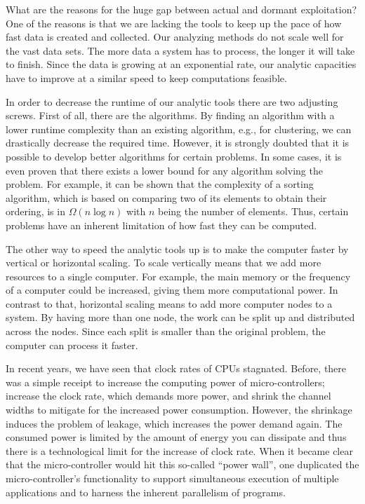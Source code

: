 What are the reasons for the huge gap between actual and dormant exploitation?
One of the reasons is that we are lacking the tools to keep up the pace of how fast data is created and collected.
Our analyzing methods do not scale well for the vast data sets.
The more data a system has to process, the longer it will take to finish.
Since the data is growing at an exponential rate, our analytic capacities have to improve at a similar speed to keep computations feasible.

In order to decrease the runtime of our analytic tools there are two adjusting screws.
First of all, there are the algorithms.
By finding an algorithm with a lower runtime complexity than an existing algorithm, e.g., for clustering, we can drastically decrease the required time.
However, it is strongly doubted that it is possible to develop better algorithms for certain problems.
In some cases, it is even proven that there exists a lower bound for any algorithm solving the problem.
For example, it can be shown that the complexity of a sorting algorithm, which is based on comparing two of its elements to obtain their ordering, is in $\Omega\left(n\log n\right)$ with $n$ being the number of elements.
Thus, certain problems have an inherent limitation of how fast they can be computed.

The other way to speed the analytic tools up is to make the computer faster by vertical or horizontal scaling.
To scale vertically means that we add more resources to a single computer.
For example, the main memory or the frequency of a computer could be increased, giving them more computational power.
In contrast to that, horizontal scaling means to add more computer nodes to a system.
By having more than one node, the work can be split up and distributed across the nodes.
Since each split is smaller than the original problem, the computer can process it faster.

In recent years, we have seen that clock rates of CPUs stagnated.
Before, there was a simple receipt to increase the computing power of micro-controllers; increase the clock rate, which demands more power, and shrink the channel widths to mitigate for the increased power consumption.
However, the shrinkage induces the problem of leakage, which increases the power demand again.
The consumed power is limited by the amount of energy you can dissipate and thus there is a technological limit for the increase of clock rate.
When it became clear that the micro-controller would hit this so-called ``power wall'', one duplicated the micro-controller's functionality to support simultaneous execution of multiple applications and to harness the inherent parallelism of programs.

